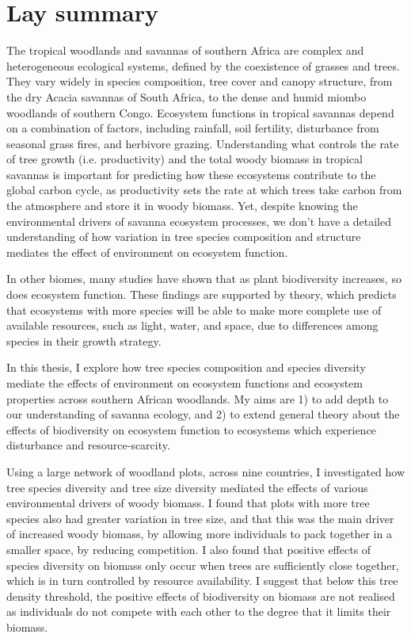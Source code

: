\chapter*{Lay summary}
\label{lay}

The tropical woodlands and savannas of southern Africa are complex and heterogeneous ecological systems, defined by the coexistence of grasses and trees. They vary widely in species composition, tree cover and canopy structure, from the dry Acacia savannas of South Africa, to the dense and humid miombo woodlands of southern Congo. Ecosystem functions in tropical savannas depend on a combination of factors, including rainfall, soil fertility, disturbance from seasonal grass fires, and herbivore grazing. Understanding what controls the rate of tree growth (i.e. productivity) and the total woody biomass in tropical savannas is important for predicting how these ecosystems contribute to the global carbon cycle, as productivity sets the rate at which trees take carbon from the atmosphere and store it in woody biomass. Yet, despite knowing the environmental drivers of savanna ecosystem processes, we don't have a detailed understanding of how variation in tree species composition and structure mediates the effect of environment on ecosystem function. 

In other biomes, many studies have shown that as plant biodiversity increases, so does ecosystem function. These findings are supported by theory, which predicts that ecosystems with more species will be able to make more complete use of available resources, such as light, water, and space, due to differences among species in their growth strategy. 

In this thesis, I explore how tree species composition and species diversity mediate the effects of environment on ecosystem functions and ecosystem properties across southern African woodlands. My aims are 1) to add depth to our understanding of savanna ecology, and 2) to extend general theory about the effects of biodiversity on ecosystem function to ecosystems which experience disturbance and resource-scarcity. 

Using a large network of woodland plots, across nine countries, I investigated how tree species diversity and tree size diversity mediated the effects of various environmental drivers of woody biomass. I found that plots with more tree species also had greater variation in tree size, and that this was the main driver of increased woody biomass, by allowing more individuals to pack together in a smaller space, by reducing competition. I also found that positive effects of species diversity on biomass only occur when trees are sufficiently close together, which is in turn controlled by resource availability. I suggest that below this tree density threshold, the positive effects of biodiversity on biomass are not realised as individuals do not compete with each other to the degree that it limits their biomass.

